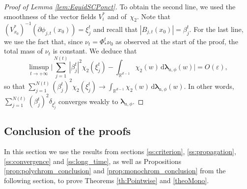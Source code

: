 \documentclass[JEP,XML,SOM,Unicode,published]{cedram}
\newcommand{\rd}{\,\mathrm{d}}
\theoremstyle{plain}
\theoremstyle{definition}
\begin{document}
\begin{proof}[Proof of Lemma \ref{lem:EquidSCPonct}]
To obtain the second line, we used the smoothness of the vector fields $V_i^*$ and of~$\chi_2$. Note that $ (V_{x_0}^*)^{-1}\left(\partial \phi_{j,t}(x_0)\right) = \xi_j^t$ and recall that $|B_{j,t}(x_0)|=\beta_j^t$. For the last line, we use the fact that, since $\nu_t=\Phi^t_*\nu_0$ as observed at the start of the proof, the total mass of $\nu_t$ is constant. We deduce that
\[
\limsup\limits_{t\to +\infty} \biggl|\sum_{j=1}^{N(t)}|\beta_j^t|^2 \chi_2(\xi_j^t) - \int_{\mathbb{R}^{d-1}} \chi_2(w) \rd \boldsymbol{\lambda}_{a,\phi}(w) \biggr| = O(\varepsilon),
\]
so that $\sum_{j=1}^{N(t)}(\beta_j^t)^2 \chi_2(\xi_j^t) \to \int_{\mathbb{R}^{d-1}} \chi_2(w) \rd \boldsymbol{\lambda}_{a,\phi}(w)$. In other words, $\sum_{j=1}^{N(t)} (\beta_j^t)^2 \delta_{\xi_j^t}$ converges weakly to $\boldsymbol{\lambda}_{a,\phi}$.
\end{proof}

\subsection{Conclusion of the proofs}\label{ss:conclusion}

In this section we use the results from sections \ref{ss:criterion}, \ref{ss:propagation}, \ref{ss:convergence} and \ref{ss:long_time}, as well as Propositions \ref{prop:polychrom_conclusion} and \ref{prop:monochrom_conclusion} from the following section, to prove Theorems \ref{th:Pointwise} and \ref{theoMono}.
\end{document}
